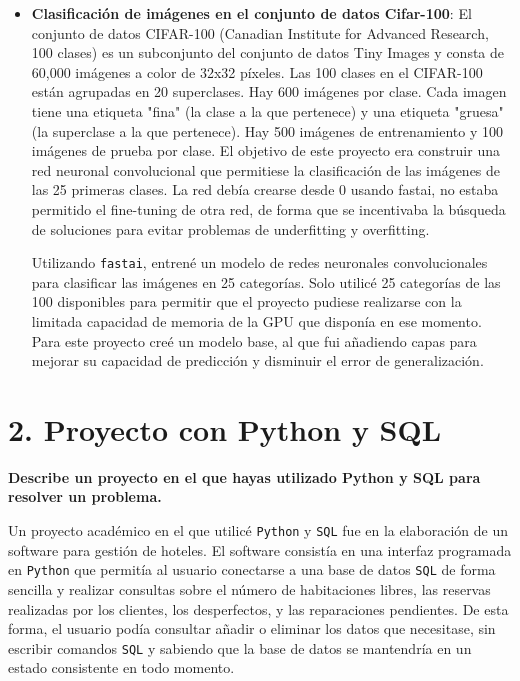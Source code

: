\documentclass[12pt,a4paper]{article}
\begin{document}
\begin{itemize}
     \item \textbf{Clasificación de imágenes en el conjunto de datos Cifar-100}: 
	El conjunto de datos CIFAR-100 (Canadian Institute for Advanced Research, 100 clases) es un subconjunto del conjunto de datos Tiny Images y consta de 60,000 imágenes a color de 32x32 píxeles. Las 100 clases en el CIFAR-100 están agrupadas en 20 superclases. Hay 600 imágenes por clase. Cada imagen tiene una etiqueta "fina" (la clase a la que pertenece) y una etiqueta "gruesa" (la superclase a la que pertenece). Hay 500 imágenes de entrenamiento y 100 imágenes de prueba por clase. El objetivo de este proyecto era construir una red neuronal convolucional que permitiese la clasificación de las imágenes de las 25 primeras clases. La red debía crearse desde 0 usando fastai, no estaba permitido el fine-tuning de otra red, de forma que se incentivaba la búsqueda de soluciones para evitar problemas de underfitting y overfitting.
		     
     Utilizando \texttt{fastai}, entrené un modelo de redes neuronales convolucionales para clasificar las imágenes en 25 categorías. Solo utilicé 25 categorías de las 100 disponibles para permitir que el proyecto pudiese realizarse con la limitada capacidad de memoria de la GPU que disponía en ese momento. Para este proyecto creé un modelo base, al que fui añadiendo capas para mejorar su capacidad de predicción y disminuir el error de generalización.
\end{itemize}

\section*{2. Proyecto con Python y SQL}

\textbf{Describe un proyecto en el que hayas utilizado Python y SQL para
resolver un problema.}

	Un proyecto académico en el que utilicé \texttt{Python} y \texttt{SQL} fue en la elaboración de un software para gestión de hoteles. El software consistía en una interfaz programada en \texttt{Python} que permitía al usuario conectarse a una base de datos \texttt{SQL} de forma sencilla y realizar consultas sobre el número de habitaciones libres, las reservas realizadas por los clientes, los desperfectos, y las reparaciones pendientes. De esta forma, el usuario podía consultar añadir o eliminar los datos que necesitase, sin escribir comandos \texttt{SQL} y sabiendo que la base de datos se mantendría en un estado consistente en todo momento.
	
\end{document}

